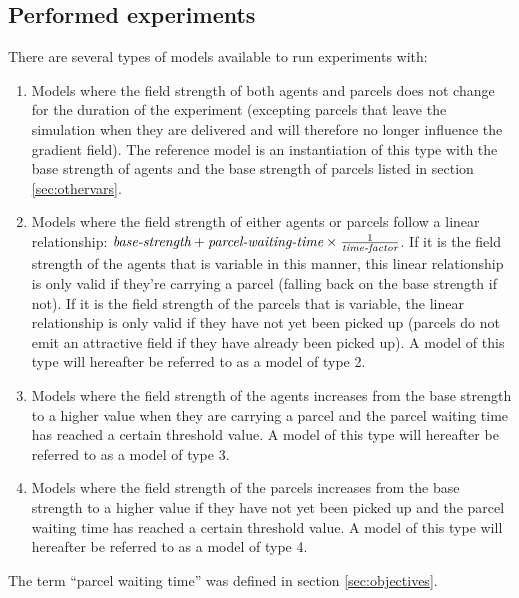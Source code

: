 \subsection{Performed experiments}
There are several types of models available to run experiments with:
\begin{enumerate}
    \item Models where the field strength of both agents and parcels does not change for the duration of the experiment (excepting parcels that leave the simulation when they are delivered and will therefore no longer influence the gradient field). The reference model is an instantiation of this type with the base strength of agents and the base strength of parcels listed in section \ref{sec:othervars}.
    \item Models where the field strength of either agents or parcels follow a linear relationship: $\emph{base-strength} + \emph{parcel-waiting-time} \times \frac{1}{\emph{time-factor}}$. If it is the field strength of the agents that is variable in this manner, this linear relationship is only valid if they're carrying a parcel (falling back on the base strength if not). If it is the field strength of the parcels that is variable, the linear relationship is only valid if they have not yet been picked up (parcels do not emit an attractive field if they have already been picked up). A model of this type will hereafter be referred to as a model of type 2.
    \item Models where the field strength of the agents increases from the base strength to a higher value when they are carrying a parcel and the parcel waiting time has reached a certain threshold value. A model of this type will hereafter be referred to as a model of type 3.
    \item Models where the field strength of the parcels increases from the base strength to a higher value if they have not yet been picked up and the parcel waiting time has reached a certain threshold value. A model of this type will hereafter be referred to as a model of type 4.
\end{enumerate}
The term ``parcel waiting time'' was defined in section \ref{sec:objectives}.

